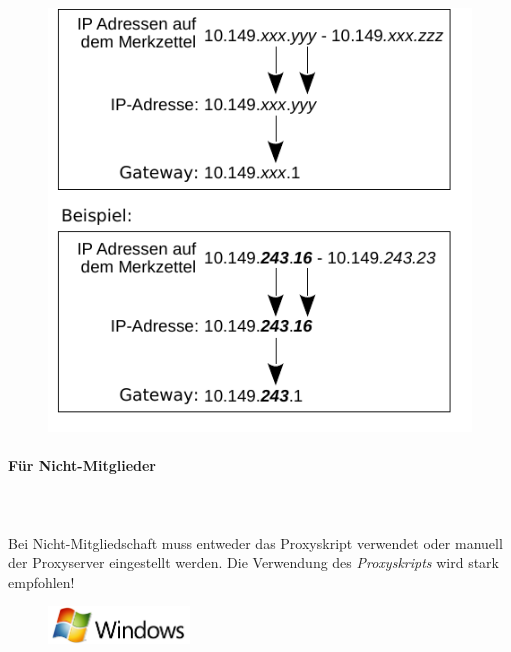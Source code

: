 \documentclass[a4paper,12pt]{scrartcl}
\begin{document}
\begin{figure}[h!]
		\centering
		\begin{minipage}[c]{0.45\linewidth}
			\centering
			\includegraphics[width=\linewidth,keepaspectratio]{Bilder/IP_Gerneric_mb}
		\end{minipage}
	\end{figure}

\paragraph*{Für Nicht-Mitglieder}~\\
\\
Bei Nicht-Mitgliedschaft muss entweder das Proxyskript verwendet oder manuell der Proxyserver eingestellt werden. Die Verwendung des \emph{Proxyskripts} wird stark empfohlen!


\newpage
\enlargethispage{20pt}


\begin{figure}[h]
	\raggedleft
	\vspace{-20pt}
	\includegraphics[height=1cm,keepaspectratio]{Bilder/Windows_logo}
	\vspace{-30pt}
\end{figure}
\end{document}
